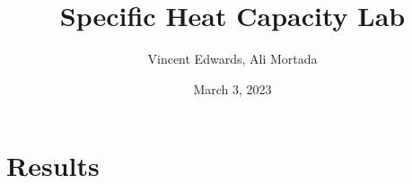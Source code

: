 \documentclass[12pt,titlepage]{article} %
\title{Specific Heat Capacity Lab}
\author{Vincent Edwards, Ali Mortada}
\date{March 3, 2023}
\begin{document}
\maketitle

\section{Results}
\end{document}
